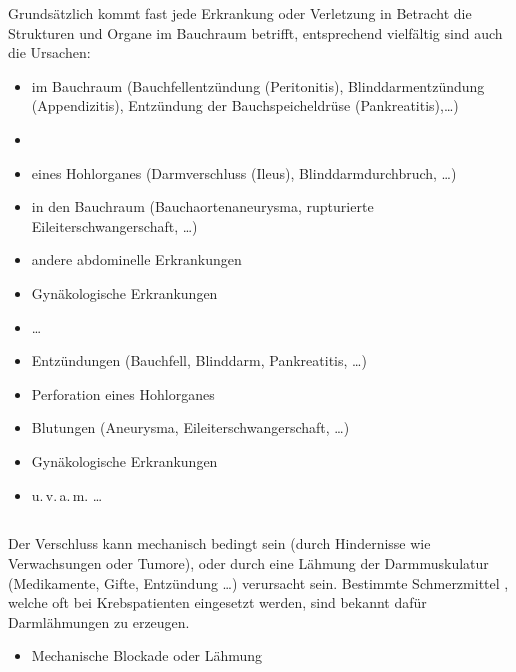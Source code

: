 {%
Grundsätzlich kommt fast jede Erkrankung oder Verletzung in
Betracht die Strukturen und Organe im Bauchraum betrifft,
entsprechend vielfältig sind auch die Ursachen: 
\begin{itemize}
  \item {} im Bauchraum (Bauchfellentzündung
  (Peritonitis), Blinddarmentzündung (Appendizitis),
  Entzündung der Bauchspeicheldrüse  (Pankreatitis),\ldots)
  \item {}
  \item {} eines Hohlorganes
  (Darmverschluss (Ileus), Blinddarmdurchbruch, \ldots)
  \item {} in den Bauchraum
  (Bauchaortenaneurysma, rupturierte Eileiterschwangerschaft, \ldots)
  \item andere abdominelle Erkrankungen
  \item Gynäkologische Erkrankungen
  \item \ldots
\end{itemize}
}{
\begin{itemize}
  \item Entzündungen (Bauchfell, Blinddarm, Pankreatitis,
  \ldots)
  \item Perforation eines Hohlorganes
  \item Blutungen (Aneurysma, Eileiterschwangerschaft,
  \ldots)
  \item Gynäkologische Erkrankungen
  \item u.\,v.\,a.\,m. \ldots
\end{itemize}
}{}{}{}






\subsection{}
%
\label{topic:ileus}%


\Text{\TxBeschreibung}
{%
Der Verschluss kann mechanisch bedingt sein (durch
Hindernisse wie Verwachsungen oder Tumore), oder durch eine
Lähmung der Darmmuskulatur (Medikamente, Gifte, Entzündung
\ldots) verursacht sein. Bestimmte Schmerzmittel
, welche oft bei Krebspatienten eingesetzt
werden, sind bekannt dafür Darmlähmungen zu erzeugen. 
}{%
\begin{itemize}
  \item Mechanische Blockade oder Lähmung
\end{itemize}
}{}{}{}


